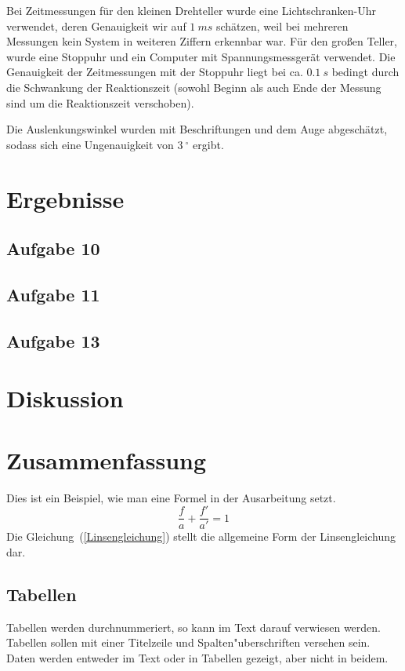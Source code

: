 \documentclass[a4paper,11pt]{article}
\begin{document}
Bei Zeitmessungen für den kleinen Drehteller wurde eine Lichtschranken-Uhr verwendet, deren Genauigkeit wir auf $\SI{1}{ms}$ schätzen, weil bei mehreren Messungen kein System in weiteren Ziffern erkennbar war. Für den großen Teller, wurde eine Stoppuhr und ein Computer mit Spannungsmessgerät verwendet. Die Genauigkeit der Zeitmessungen mit der Stoppuhr liegt bei ca. $\SI{0.1}{s}$ bedingt durch die Schwankung der Reaktionszeit (sowohl Beginn als auch Ende der Messung sind um die Reaktionszeit verschoben).

Die Auslenkungswinkel wurden mit Beschriftungen und dem Auge abgeschätzt, sodass sich eine Ungenauigkeit von $\SI{3}{^\circ}$ ergibt.

\section{Ergebnisse}
\subsection{Aufgabe 10}


\subsection{Aufgabe 11}


\subsection{Aufgabe 13}


\section{Diskussion}

\section{Zusammenfassung}

\begin{center}
Dies ist ein Beispiel, wie man eine
Formel in der Ausarbeitung setzt.
\begin{equation}\label{Linsengleichung}
\frac{f}{a} + \frac{f'}{a'} = 1
\end{equation}
Die Gleichung~(\ref{Linsengleichung}) stellt die
allgemeine Form der Linsengleichung dar.%
\end{center}

\subsection{Tabellen}
Tabellen werden durchnummeriert, so kann im  Text  darauf  verwiesen werden.
Tabellen sollen mit einer  Titelzeile und Spalten"uberschriften versehen sein.
Daten werden entweder im Text oder in Tabellen gezeigt, aber nicht in beidem.
\end{document}
